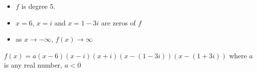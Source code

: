 {\begin{itemize}

\item $f$ is degree $5$.
\item $x=6$, $x = i$ and $x = 1-3i$ are zeros of $f$
\item as $x \rightarrow -\infty$, $f(x) \rightarrow \infty$

\end{itemize}}
{$f(x) = a(x-6)(x-i)(x+i)(x-(1-3i))(x-(1+3i))$ where $a$ is any real number,  $a < 0$}
